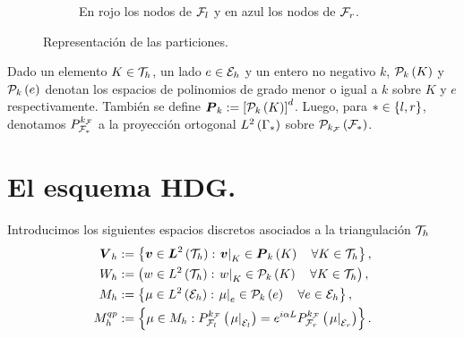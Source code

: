 \begin{figure}[H]
\begin{subfigure}[b]{0.45\textwidth}
        \caption{En rojo los nodos de $\mathcal{F}_l$ y en azul los nodos de $\mathcal{F}_r$.}
        \label{fig:domain_2}
    \end{subfigure}
    \label{fig:domain}
    \caption{Representación de las particiones.}
\end{figure}

Dado un elemento $K \in \mathcal{T}_h$, un lado $e \in \mathcal{E}_h$ y un entero no negativo $k$, ${\mathcal P}_k \left( K \right)$ y ${\mathcal P}_k \left( e \right)$ denotan los espacios de polinomios de grado menor o igual a $k$ sobre $K$ y $e$ respectivamente. También se define $\boldsymbol P_k := \left[ {\mathcal P}_k \left( K \right) \right]^d$. Luego, para $\ast \in \left\{ l,r \right\}$, denotamos $P_{\mathcal{F}_{\ast}}^{k_{\mathcal{F}}}$ a la proyección ortogonal $L^2 \left( \Gamma_\ast \right)$ sobre ${\mathcal P}_{k_{\mathcal{F}}} \left( \mathcal{F}_\ast \right)$.

\section{El esquema HDG.}
Introducimos los siguientes espacios discretos asociados a la triangulación $\mathcal{T}_h$
\begin{align*}
    \boldsymbol V_h &:=\left\{ \boldsymbol v \in \boldsymbol L^2 \left( \mathcal{T}_h \right): \left.\boldsymbol v \right|_K \in \boldsymbol P_k \left( K \right) \quad \forall K \in \mathcal{T}_h \right\}, \\ 
    W_h &:= \left( w \in L^2 \left( \mathcal{T}_h \right):  \left. w \right|_K \in {\mathcal P}_k \left( K \right) \quad \forall K \in \mathcal{T}_h \right), \\
    M_h &:= \left\{ \mu \in L^2 \left( \mathcal{E}_h \right):  \left. \mu \right|_e \in {\mathcal P}_k \left( e \right) \quad  \forall e \in \mathcal{E}_h \right\}, \\
    M_h^{qp} &:= \left\{ \mu \in M_h: P_{\mathcal{F}_l}^{k_{\mathcal{F}}} \left(  \left. \mu \right|_{\mathcal{E}_l} \right) = e^{i \alpha L} P_{\mathcal{F}_r}^{k_{\mathcal{F}}} \left(  \left. \mu \right|_{\mathcal{E}_r} \right)  \right\}. 
\end{align*}
